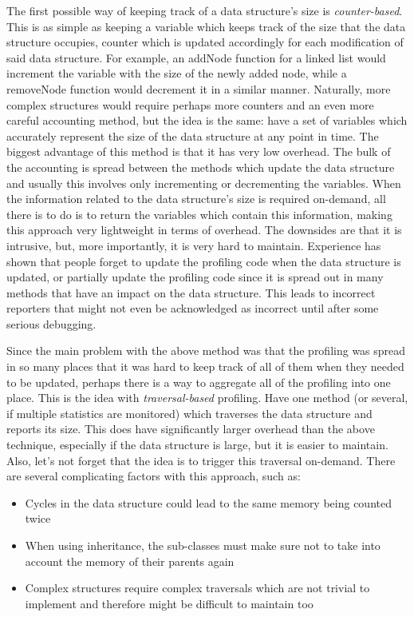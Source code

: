 The first possible way of keeping track of a data structure's size is \textit{counter-based}. This is as simple as keeping a variable which keeps track of the size that the data structure occupies, counter which is updated accordingly for each modification of said data structure. For example, an addNode function for a linked list would increment the variable with the size of the newly added node, while a removeNode function would decrement it in a similar manner. Naturally, more complex structures would require perhaps more counters and an even more careful accounting method, but the idea is the same: have a set of variables which accurately represent the size of the data structure at any point in time. The biggest advantage of this method is that it has very low overhead. The bulk of the accounting is spread between the methods which update the data structure and usually this involves only incrementing or decrementing the variables. When the information related to the data structure's size is required on-demand, all there is to do is to return the variables which contain this information, making this approach very lightweight in terms of overhead. The downsides are that it is intrusive, but, more importantly, it is very hard to maintain. Experience has shown \cite{Nethercote12} that people forget to update the profiling code when the data structure is updated, or partially update the profiling code since it is spread out in many methods that have an impact on the data structure. This leads to incorrect reporters that might not even be acknowledged as incorrect until after some serious debugging.

Since the main problem with the above method was that the profiling was spread in so many places that it was hard to keep track of all of them when they needed to be updated, perhaps there is a way to aggregate all of the profiling into one place. This is the idea with \textit{traversal-based} profiling. Have one method (or several, if multiple statistics are monitored) which traverses the data structure and reports its size. This does have significantly larger overhead than the above technique, especially if the data structure is large, but it is easier to maintain. Also, let's not forget that the idea is to trigger this traversal on-demand. There are several complicating factors with this approach, such as:
\begin{itemize}
\item Cycles in the data structure could lead to the same memory being counted twice
\item When using inheritance, the sub-classes must make sure not to take into account the memory of their parents again
\item Complex structures require complex traversals which are not trivial to implement and therefore might be difficult to maintain too
\end{itemize}


